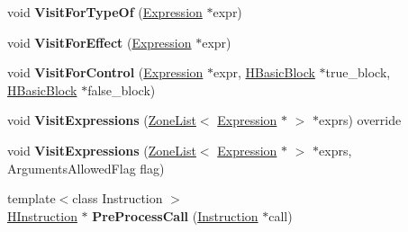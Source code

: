 \begin{DoxyCompactItemize}
\item 
void {\bfseries Visit\+For\+Type\+Of} (\hyperlink{classv8_1_1internal_1_1_expression}{Expression} $\ast$expr)\hypertarget{classv8_1_1internal_1_1_h_optimized_graph_builder_a29d49ae6c2388ca5dcc5a77c307abb6d}{}\label{classv8_1_1internal_1_1_h_optimized_graph_builder_a29d49ae6c2388ca5dcc5a77c307abb6d}

\item 
void {\bfseries Visit\+For\+Effect} (\hyperlink{classv8_1_1internal_1_1_expression}{Expression} $\ast$expr)\hypertarget{classv8_1_1internal_1_1_h_optimized_graph_builder_ae5050fd03fa6ed908ab202038ac75259}{}\label{classv8_1_1internal_1_1_h_optimized_graph_builder_ae5050fd03fa6ed908ab202038ac75259}

\item 
void {\bfseries Visit\+For\+Control} (\hyperlink{classv8_1_1internal_1_1_expression}{Expression} $\ast$expr, \hyperlink{classv8_1_1internal_1_1_h_basic_block}{H\+Basic\+Block} $\ast$true\+\_\+block, \hyperlink{classv8_1_1internal_1_1_h_basic_block}{H\+Basic\+Block} $\ast$false\+\_\+block)\hypertarget{classv8_1_1internal_1_1_h_optimized_graph_builder_a12e689463aa85cb2d40d3525533fab19}{}\label{classv8_1_1internal_1_1_h_optimized_graph_builder_a12e689463aa85cb2d40d3525533fab19}

\item 
void {\bfseries Visit\+Expressions} (\hyperlink{classv8_1_1internal_1_1_zone_list}{Zone\+List}$<$ \hyperlink{classv8_1_1internal_1_1_expression}{Expression} $\ast$ $>$ $\ast$exprs) override\hypertarget{classv8_1_1internal_1_1_h_optimized_graph_builder_a5187265b5a55fd9fb17609e55a6a367d}{}\label{classv8_1_1internal_1_1_h_optimized_graph_builder_a5187265b5a55fd9fb17609e55a6a367d}

\item 
void {\bfseries Visit\+Expressions} (\hyperlink{classv8_1_1internal_1_1_zone_list}{Zone\+List}$<$ \hyperlink{classv8_1_1internal_1_1_expression}{Expression} $\ast$ $>$ $\ast$exprs, Arguments\+Allowed\+Flag flag)\hypertarget{classv8_1_1internal_1_1_h_optimized_graph_builder_ac9cbd159ccc8139ee7f644e4b99f2d1b}{}\label{classv8_1_1internal_1_1_h_optimized_graph_builder_ac9cbd159ccc8139ee7f644e4b99f2d1b}

\item 
{\footnotesize template$<$class Instruction $>$ }\\\hyperlink{classv8_1_1internal_1_1_h_instruction}{H\+Instruction} $\ast$ {\bfseries Pre\+Process\+Call} (\hyperlink{classv8_1_1internal_1_1_instruction}{Instruction} $\ast$call)\hypertarget{classv8_1_1internal_1_1_h_optimized_graph_builder_ae3a68301b25bbe28b1d1038df302d5f2}{}\label{classv8_1_1internal_1_1_h_optimized_graph_builder_ae3a68301b25bbe28b1d1038df302d5f2}


\end{DoxyCompactItemize}
